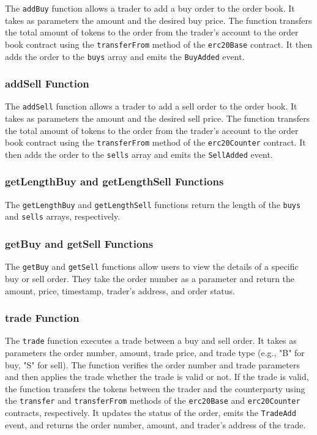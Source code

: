 The \texttt{addBuy} function allows a trader to add a buy order to the order book. It takes as parameters the amount and the desired buy price.
The function transfers the total amount of tokens to the order from the trader's account  to the order book contract using the \texttt{transferFrom}
method of the \texttt{erc20Base} contract. It then adds the order to the \texttt{buys} array and emits the \texttt{BuyAdded} event.


\subsubsection{addSell Function}


The \texttt{addSell} function allows a trader to add a sell order to the order book. It takes as parameters the amount and the desired sell price.
The function transfers the total amount of tokens to the order from the trader's account  to the order book contract using the \texttt{transferFrom}
method of the \texttt{erc20Counter} contract. It then adds the order to the \texttt{sells} array and emits the \texttt{SellAdded} event.


\subsubsection{getLengthBuy and getLengthSell Functions}


The \texttt{getLengthBuy} and \texttt{getLengthSell} functions return the length of the \texttt{buys} and \texttt{sells} arrays, respectively.


\subsubsection{getBuy and getSell Functions}


The \texttt{getBuy} and \texttt{getSell} functions allow users to view the details of a specific buy or sell order. They take the order number as a parameter and return the amount, price, timestamp, trader's address, and order status.


\subsubsection{trade Function}


The \texttt{trade} function executes a trade between a buy and sell order. It takes as parameters the order number, amount, trade price, and trade type (e.g., "B" for buy, "S" for sell). The function verifies the order number and trade parameters and then applies the trade whether the trade is valid or not.
If the trade is valid, the function transfers the tokens between the trader and the counterparty using the \texttt{transfer} and \texttt{transferFrom} methods of the \texttt{erc20Base} and \texttt{erc20Counter} contracts, respectively. It updates the status of the order, emits the \texttt{TradeAdd} event, and returns
the order number, amount, and trader's address of the trade.



